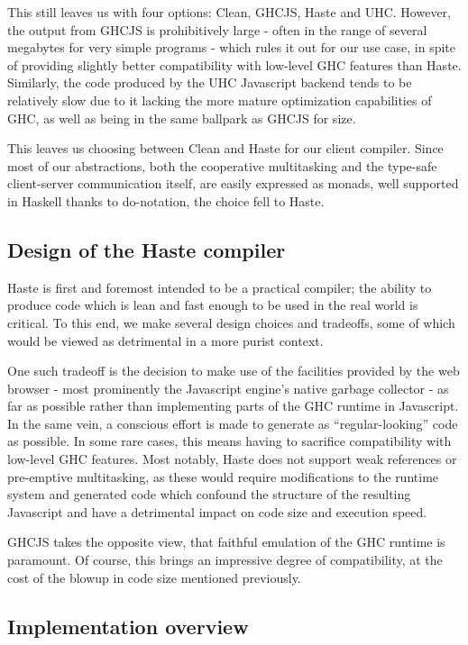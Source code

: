 \documentclass[preprint]{sigplanconf}
\begin{document}
This still leaves us with four options: Clean, GHCJS, Haste and UHC. However,
the output from GHCJS is prohibitively large - often in the range of several
megabytes for very simple programs - which rules it out for our use case, in
spite of providing slightly better compatibility with low-level GHC features
than Haste. Similarly, the code produced by the UHC Javascript backend tends to
be relatively slow due to it lacking the more mature optimization capabilities
of GHC, as well as being in the same ballpark as GHCJS for size.\ \cite{haste}

This leaves us choosing between Clean and Haste for our client compiler. Since
most of our abstractions, both the cooperative multitasking and the type-safe
client-server communication itself, are easily expressed as monads, well
supported in Haskell thanks to do-notation, the choice fell to Haste.

\subsection{Design of the Haste compiler}

Haste is first and foremost intended to be a practical compiler; the ability
to produce code which is lean and fast enough to be used in the real world is
critical. To this end, we make several design choices and tradeoffs, some of
which would be viewed as detrimental in a more purist context.

One such tradeoff is the decision to make use of the facilities provided by the
web browser - most prominently the Javascript engine's native garbage
collector - as far as possible rather than implementing parts of the GHC
runtime in Javascript. In the same vein, a conscious effort is made to generate
as ``regular-looking'' code as possible. In some rare cases, this means having
to sacrifice compatibility with low-level GHC features. Most notably, Haste
does not support weak references or pre-emptive multitasking, as these would
require modifications to the runtime system and generated code which confound
the structure of the resulting Javascript and have a detrimental impact on code
size and execution speed.

GHCJS takes the opposite view, that faithful emulation of the GHC runtime is
paramount. Of course, this brings an impressive degree of compatibility, at the
cost of the blowup in code size mentioned previously.

\subsection{Implementation overview}
\end{document}
